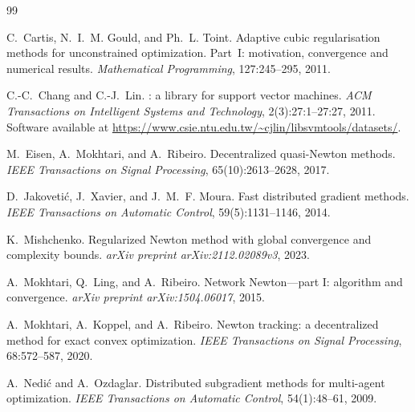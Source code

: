 \documentclass[10pt,twocolumn,letterpaper]{article}
\theoremstyle{compact}
\theoremstyle{compactremark}
\begin{document}

{\small
	\begin{thebibliography}{99}
	\setlength{\itemsep}{0pt}\setlength{\parsep}{0pt}\setlength{\parskip}{0pt}
		
		C.~Cartis, N.~I.~M. Gould, and Ph.~L. Toint.
		\newblock Adaptive cubic regularisation methods for unconstrained optimization. Part~I: motivation, convergence and numerical results.
		\newblock \emph{Mathematical Programming}, 127:245--295, 2011.
		
		C.-C.~Chang and C.-J.~Lin.
		: a library for support vector machines.
		\newblock \emph{ACM Transactions on Intelligent Systems and Technology}, 2(3):27:1--27:27, 2011.
		\newblock Software available at \url{https://www.csie.ntu.edu.tw/~cjlin/libsvmtools/datasets/}.
		
		M.~Eisen, A.~Mokhtari, and A.~Ribeiro.
		\newblock Decentralized quasi-{N}ewton methods.
		\newblock \emph{IEEE Transactions on Signal Processing}, 65(10):2613--2628, 2017.
		
		D.~Jakoveti{\'c}, J.~Xavier, and J.~M.~F. Moura.
		\newblock Fast distributed gradient methods.
		\newblock \emph{IEEE Transactions on Automatic Control}, 59(5):1131--1146, 2014.
		
		K.~Mishchenko.
		\newblock Regularized {N}ewton method with global convergence and complexity bounds.
		\newblock \emph{arXiv preprint arXiv:2112.02089v3}, 2023.
		
		A.~Mokhtari, Q.~Ling, and A.~Ribeiro.
		\newblock Network {N}ewton---part {I}: algorithm and convergence.
		\newblock \emph{arXiv preprint arXiv:1504.06017}, 2015.
		
		A.~Mokhtari, A.~Koppel, and A.~Ribeiro.
		\newblock Newton tracking: a decentralized method for exact convex optimization.
		\newblock \emph{IEEE Transactions on Signal Processing}, 68:572--587, 2020.
		
		A.~Nedi{\'c} and A.~Ozdaglar.
		\newblock Distributed subgradient methods for multi-agent optimization.
		\newblock \emph{IEEE Transactions on Automatic Control}, 54(1):48--61, 2009.
		

\end{thebibliography}}
\end{document}
